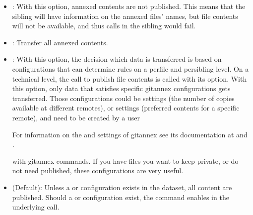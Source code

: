 \begin{itemize}
\item {} 
\sphinxAtStartPar
{}: With this option, annexed contents are not published. This
means that the sibling will have information on the annexed files’ names, but
file contents will not be available, and thus  calls in the
sibling would fail.

\item {} 
\sphinxAtStartPar
{}: Transfer all annexed contents.

\item {} 
\sphinxAtStartPar
{}: With this option, the decision which data is transferred is based on configurations that can determine rules on a per\sphinxhyphen{}file and per\sphinxhyphen{}sibling level.
On a technical level, the  call to publish file contents is called with its  option.
With this option, only data that satisfies specific git\sphinxhyphen{}annex configurations gets transferred.
Those configurations could be  settings (the number of copies available at different remotes), or  settings (preferred contents for a specific remote), and need to be created by a user%
\begin{footnote}\sphinxAtStartFootnote
For information on the  and  settings of git\sphinxhyphen{}annex see its documentation at  and .
%
\end{footnote} with git\sphinxhyphen{}annex commands. If you have files you want to keep private, or do not need published, these configurations are very useful.

\item {} 
\sphinxAtStartPar
{} (Default): Unless a  or  configuration exists in the dataset, all content are published. Should a  or  configuration exist, the command enables  in the underlying  call.

\end{itemize}

